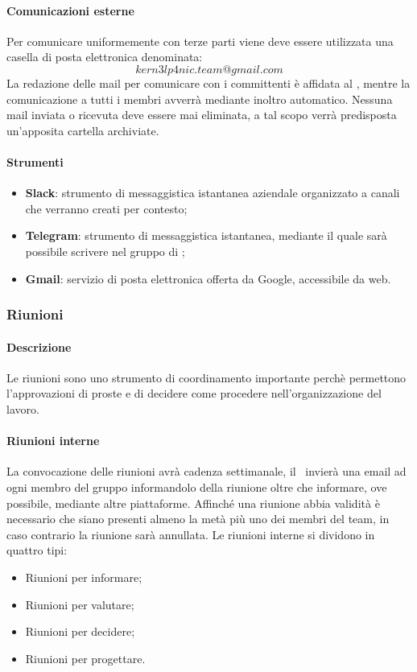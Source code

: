 \documentclass[../NormeDiProgetto_v4.0.0.tex]{subfiles}
\begin{document}
			\paragraph{Comunicazioni esterne}
				Per comunicare uniformemente con terze parti viene deve essere utilizzata una casella di posta elettronica denominata:\\
				\begin{equation*}
				kern3lp4nic.team@gmail.com
				\end{equation*}
				La redazione delle mail per comunicare con i committenti è affidata al \responsabilediprogetto, mentre la comunicazione a tutti i membri avverrà mediante inoltro automatico.
				Nessuna mail inviata o ricevuta deve essere mai eliminata, a tal scopo verrà predisposta un'apposita cartella archiviate.
			\paragraph{Strumenti}
				\begin{itemize}
					\item \textbf{Slack}: strumento di messaggistica istantanea aziendale organizzato a canali che verranno creati per contesto;
					\item \textbf{Telegram}: strumento di messaggistica istantanea, mediante il quale sarà possibile scrivere nel gruppo di \kpanic;
					\item \textbf{Gmail}: servizio di posta elettronica offerta da Google, accessibile da web.
				\end{itemize}
		
		\subsubsection{Riunioni}
			\paragraph{Descrizione}
				Le riunioni sono uno strumento di coordinamento importante perchè permettono l'approvazioni di proste e di decidere come procedere nell'organizzazione del lavoro. 
			\paragraph{Riunioni interne}
				La convocazione delle riunioni avrà cadenza settimanale, il \responsabilediprogetto\ invierà una email ad ogni membro del gruppo informandolo della riunione oltre che informare, ove possibile, mediante altre piattaforme.
				Affinché una riunione abbia validità è necessario che siano presenti almeno la metà più uno dei membri del team, in caso contrario la riunione sarà annullata.
				Le riunioni interne si dividono in quattro tipi:
				\begin{itemize}
					\item Riunioni per informare;
					\item Riunioni per valutare;
					\item Riunioni per decidere;
					\item Riunioni per progettare.
				\end{itemize}
\end{document}
